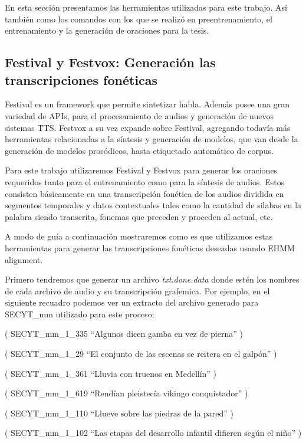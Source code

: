 En esta sección presentamos las herramientas utilizadas para este trabajo. Así también como los comandos con los que se realizó en preentrenamiento, el entrenamiento y la generación de oraciones para la tesis.

\subsection{Festival y Festvox: Generación las transcripciones fonéticas}

Festival es un framework que permite sintetizar habla. Además posee una gran variedad de APIs, para el procesamiento de audios y generación de nuevos sistemas TTS. Festvox a su vez expande sobre Festival, agregando todavía más herramientas relacionadas a la síntesis y generación de modelos, que van desde la generación de modelos prosódicos, hasta etiquetado automático de corpus.

Para este trabajo utilizaremos Festival y Festvox para generar los oraciones requeridos tanto para el entrenamiento como para la síntesis de audios. Estos consisten básicamente en una transcripción fonética de los audios dividida en segmentos temporales y datos contextuales tales como la cantidad de silabas en la palabra siendo transcrita, fonemas que preceden y proceden al actual, etc.

A modo de guía a continuación mostraremos como es que utilizamos estas herramientas para generar las transcripciones fonéticas deseadas usando EHMM alignment.

Primero tendremos que generar un archivo \textit{txt.done.data} donde estén los nombres de cada archivo de audio y su transcripción grafemica. Por ejemplo, en el siguiente recuadro podemos ver un extracto del archivo generado para SECYT\_mm utilizado para este proceso:

\begin{tcolorbox}
( SECYT\_mm\_1\_335 ``Algunos dicen gamba en vez de pierna'' )

( SECYT\_mm\_1\_29 ``El conjunto de las escenas se reitera en el galpón'' )

( SECYT\_mm\_1\_361 ``Lluvia con truenos en Medellín'' )

( SECYT\_mm\_1\_619 ``Rendían pleistecía vikingo conquistador'' )

( SECYT\_mm\_1\_110 ``Llueve sobre las piedras de la pared'' )

( SECYT\_mm\_1\_102 ``Las etapas del desarrollo infantil difieren según el niño'' )

\end{tcolorbox}

